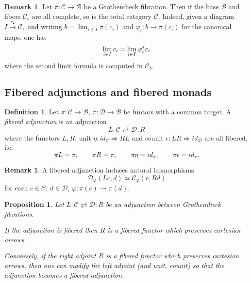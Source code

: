 \documentclass[a4paper,10pt
,draft
]{article}%
\numberwithin{equation}{section}
\numberwithin{figure}{section}
\newtheorem{proposition}[equation]{Proposition}%
\theoremstyle{definition} %
\newtheorem{definition}[equation]{Definition}%
\newtheorem{remark}[equation]{Remark}%
\newcommand{\1}{\ensuremath{\mathbbm 1}}%
\begin{document}
\begin{remark}
Let $\pi \colon \mathcal{C} \to \mathcal{B}$ be a Grothendieck fibration.
Then if the base $\mathcal{B}$ and fibers 
$\mathcal{C}_b$
are all complete, so is the total category $\mathcal{C}$.
%
Indeed, given a diagram $I \xrightarrow{c_{\bullet}} \mathcal{C}$,\
and writing
$b = \lim_{i \in I} \pi(c_i)$
and 
$\varphi_i \colon b \to \pi(c_i)$
for the canonical maps,
one has
\[
\lim_{i \in I} c_i = 
\lim_{i \in I} \varphi_{i}^{\**}c_i
\]
where the second limit formula is computed in $\mathcal{C}_b$.
\end{remark}





\subsection{Fibered adjunctions and fibered monads}
\label{FIBCAT_SEC}



\begin{definition}
Let 
$\pi \colon \mathcal{C} \to \mathcal{B}$,
$\pi \colon \mathcal{D} \to \mathcal{B}$
be funtors with a common target.
A \emph{fibered adjunction} is an adjunction
\[
L \colon \mathcal{C} \rightleftarrows \mathcal{D} \colon R
\]
where the functors $L,R$, 
unit $\eta \colon id_{\mathcal{C}} \Rightarrow RL$ and 
counit $\epsilon \colon LR \Rightarrow id_{\mathcal{D}}$
are all fibered, i.e.
\[
\pi L=\pi, \qquad
\pi R = \pi, \qquad
\pi \eta = id_{\pi}, \qquad 
\pi\epsilon = id_{\pi}.
\]
\end{definition}



\begin{remark}
A fibered adjunction induces natural isomorphisms
\[
\mathcal{D}_{\varphi}\left(Lc,d\right)
\simeq
\mathcal{C}_{\varphi}\left(c,Rd\right)
\]
for each $c\in \mathcal{C}$, $d \in \mathcal{D}$, 
$\varphi \colon \pi(c)\to \pi(d)$. 
\end{remark}



\begin{proposition}\label{FIBADJCAR PROP}
Let $L \colon \mathcal{C} \rightleftarrows \mathcal{D} \colon R$
be an adjunction between Grothendieck fibrations.

If the adjunction is fibered then 
$R$ is 
a fibered functor which preserves cartesian arrows.

Conversely, if the right adjoint $R$ is 
a fibered functor which preserves cartesian arrows, 
then one can modify the left adjoint (and unit, counit)
so that the adjunction becomes a fibered adjunction.
\end{proposition}
\end{document}
